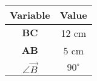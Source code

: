 \begin{center}
    \begin{tabular}{|c|c|} 
        \hline
            \textbf{Variable} & \textbf{Value} \\ 
        \hline
            $\boldsymbol{BC}$ & 12 cm \\ 
        \hline
            $\boldsymbol{AB}$ & 5 cm \\ 
        \hline
            $\angle \vec{B}$  & $90^\circ$ \\
        \hline
    \end{tabular}
\end{center}  
